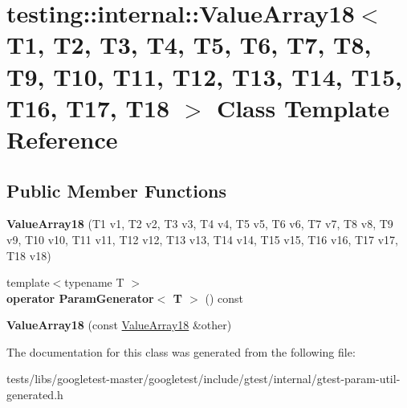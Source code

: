 \hypertarget{classtesting_1_1internal_1_1ValueArray18}{}\section{testing\+:\+:internal\+:\+:Value\+Array18$<$ T1, T2, T3, T4, T5, T6, T7, T8, T9, T10, T11, T12, T13, T14, T15, T16, T17, T18 $>$ Class Template Reference}
\label{classtesting_1_1internal_1_1ValueArray18}
\subsection*{Public Member Functions}
\begin{DoxyCompactItemize}
\item 
\mbox{\label{classtesting_1_1internal_1_1ValueArray18_adf8554745ebde65aba76a7bc6c1a5a06}} 
{\bfseries Value\+Array18} (T1 v1, T2 v2, T3 v3, T4 v4, T5 v5, T6 v6, T7 v7, T8 v8, T9 v9, T10 v10, T11 v11, T12 v12, T13 v13, T14 v14, T15 v15, T16 v16, T17 v17, T18 v18)
\item 
\mbox{\label{classtesting_1_1internal_1_1ValueArray18_a403e37450f8f4b21d38890d172ec57c0}} 
{\footnotesize template$<$typename T $>$ }\\{\bfseries operator Param\+Generator$<$ T $>$} () const
\item 
\mbox{\label{classtesting_1_1internal_1_1ValueArray18_a09150c1d1ee21f7bec61f673b2b8cae0}} 
{\bfseries Value\+Array18} (const \hyperlink{classtesting_1_1internal_1_1ValueArray18}{Value\+Array18} \&other)
\end{DoxyCompactItemize}


The documentation for this class was generated from the following file\+:\begin{DoxyCompactItemize}
\item 
tests/libs/googletest-\/master/googletest/include/gtest/internal/gtest-\/param-\/util-\/generated.\+h\end{DoxyCompactItemize}
